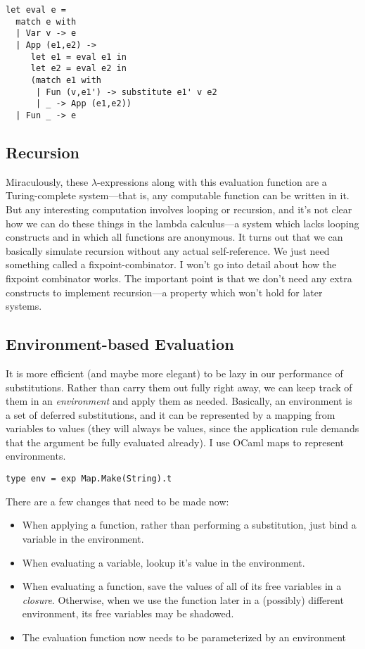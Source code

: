 \documentclass[pageno]{jpaper}
\begin{document}
{\begin{lstlisting}
let eval e =
  match e with
  | Var v -> e
  | App (e1,e2) ->
     let e1 = eval e1 in
     let e2 = eval e2 in
     (match e1 with
      | Fun (v,e1') -> substitute e1' v e2
      | _ -> App (e1,e2))
  | Fun _ -> e

\end{lstlisting}

\subsection{Recursion}
Miraculously, these $\lambda$-expressions along with this evaluation function are a Turing-complete system---that is, any computable function can be written in it.
But any interesting computation involves looping or recursion, and it's not clear how we can do these
things in the lambda calculus---a system which lacks looping constructs and in which all functions are anonymous. It turns out that we can basically simulate recursion without any actual self-reference.
We just need something called a fixpoint-combinator.  I won't go into detail about how the fixpoint
combinator works.  The important point is that we don't need any extra constructs to implement recursion---a
property which won't hold for later systems.

\subsection{Environment-based Evaluation}
It is more efficient (and maybe more elegant) to be lazy in our performance of substitutions.
Rather than carry them out fully right away, we can keep track of them in an \textit{environment}
and apply them as needed.  Basically, an environment is a set of deferred substitutions, and it can
be represented by a mapping from variables to values (they will always be values,
since the application rule demands that the argument be fully evaluated already).
I use OCaml maps to represent environments.

\begin{lstlisting}
type env = exp Map.Make(String).t
\end{lstlisting}

There are a few changes that need to be made now:

\begin{itemize}
\item When applying a function, rather than performing a substitution, just bind a variable in
the environment.
\item When evaluating a variable, lookup it's value in the environment.
\item When evaluating a function, save the values of all of its free variables in a \textit{closure}.
Otherwise, when we use the function later in a (possibly) different environment, its free variables
may be shadowed.
\item The evaluation function now needs to be parameterized by an environment
\end{itemize}

}
\end{document}
